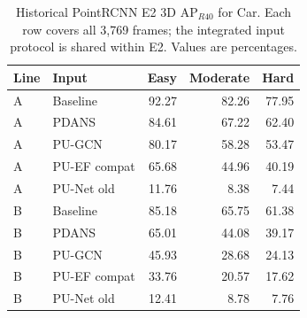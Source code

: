 \begin{table}[!t]\centering\setlength{\tabcolsep}{5pt}
\begin{tabular}{llrrr}\toprule
Line & Input & Easy & Moderate & Hard\\\midrule

A & Baseline & 92.27 & 82.26 & 77.95\\

A & PDANS & 84.61 & 67.22 & 62.40\\

A & PU-GCN & 80.17 & 58.28 & 53.47\\

A & PU-EF compat & 65.68 & 44.96 & 40.19\\

A & PU-Net old & 11.76 & 8.38 & 7.44\\

\midrule

B & Baseline & 85.18 & 65.75 & 61.38\\

B & PDANS & 65.01 & 44.08 & 39.17\\

B & PU-GCN & 45.93 & 28.68 & 24.13\\

B & PU-EF compat & 33.76 & 20.57 & 17.62\\

B & PU-Net old & 12.41 & 8.78 & 7.76\\

\bottomrule\end{tabular}
\caption{Historical PointRCNN E2 3D AP$_{R40}$ for Car. Each row covers all 3,769 frames; the integrated input protocol is shared within E2. Values are percentages.}\label{tab:k-e2-3d}\end{table}

